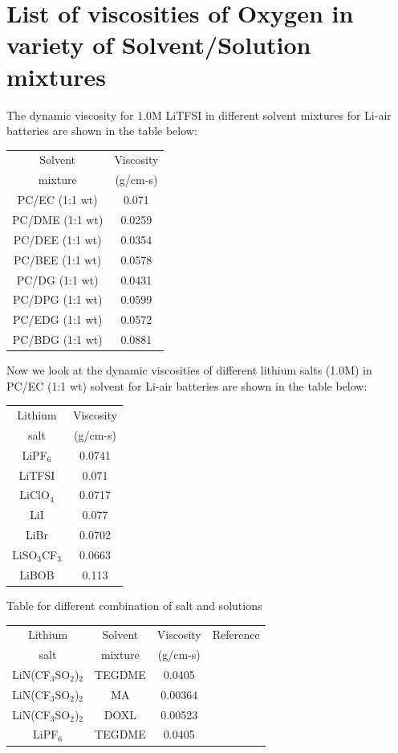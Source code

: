 \documentclass[12pt]{book}
\begin{document}
\section{List of viscosities of Oxygen in variety of Solvent/Solution mixtures}
The dynamic viscosity for  1.0M LiTFSI in different solvent mixtures for Li-air batteries \cite{Xu2009} are shown in the table below:
\begin{center}
\begin{tabular}{ |c|| c| }
 \hline
 Solvent & Viscosity\\
mixture &(g/cm-s)\\\hline
PC/EC (1:1 wt) & 0.071 \\
PC/DME (1:1 wt) & 0.0259 \\
PC/DEE (1:1 wt) & 0.0354 \\
PC/BEE (1:1 wt) & 0.0578 \\
PC/DG (1:1 wt) & 0.0431 \\
PC/DPG (1:1 wt) & 0.0599 \\
PC/EDG (1:1 wt) & 0.0572 \\ 
PC/BDG (1:1 wt) & 0.0881 \\
  \hline
\end{tabular}
\end{center}
Now we look at the dynamic viscosities of different lithium salts (1.0M) in PC/EC (1:1 wt) solvent for Li-air batteries \cite{Xu2009} are shown in the table below:
\begin{center}
\begin{tabular}{ |c|| c| }
 \hline
 Lithium & Viscosity\\
salt &(g/cm-s)\\\hline
LiPF$_6$ & 0.0741 \\
LiTFSI & 0.071 \\
LiClO$_4$ & 0.0717 \\
LiI & 0.077 \\
LiBr & 0.0702 \\
LiSO$_3$CF$_3$ & 0.0663 \\
LiBOB & 0.113 \\ 
  \hline
\end{tabular}
\end{center}
Table for different combination of salt and solutions
\begin{center}
\begin{tabular}{ |c| c|| c||c| }
 \hline
 Lithium & Solvent & Viscosity & Reference\\
salt & mixture &(g/cm-s)& \\\hline
LiN(CF$_3$SO$_2$)$_2$ & TEGDME &	0.0405 &\cite{Ryu2006} \\
LiN(CF$_3$SO$_2$)$_2$ & MA &	0.00364 &\cite{Ryu2006} \\
LiN(CF$_3$SO$_2$)$_2$ & DOXL &	0.00523 &\cite{Ryu2006} \\
LiPF$_6$ & TEGDME &	0.0405 &\cite{Laoire2011} \\
  \hline
\end{tabular}
\end{center}
\end{document}
